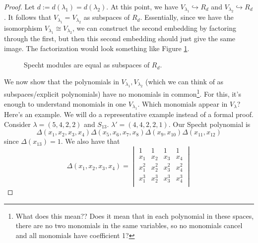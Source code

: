 \documentclass[../notes.tex]{subfiles}
\begin{document}
\begin{itemize}
\begin{proof}
        Let $d:=d(\lambda_1)=d(\lambda_2)$. At this point, we have $V_{\lambda_1}\hookrightarrow R_d$ and $V_{\lambda_2}\hookrightarrow R_d$. It follows that $V_{\lambda_1}=V_{\lambda_2}$ as subspaces of $R_d$. Essentially, since we have the isomorphism $V_{\lambda_1}\cong V_{\lambda_2}$, we can construct the second embedding by factoring through the first, but then this second embedding should just give the same image. The factorization would look something like Figure \ref{fig:SpechtSubspace}.
        \begin{figure}[H]
            \centering
            \caption{Specht modules are equal as subspaces of $R_d$.}
            \label{fig:SpechtSubspace}
        \end{figure}
        We now show that the polynomials in $V_{\lambda_1},V_{\lambda_2}$ (which we can think of as subspaces/explicit polynomials) have no monomials in common\footnote{What does this mean?? Does it mean that in each polynomial in these spaces, there are no two monomials in the same variables, so no monomials cancel and all monomials have coefficient 1?}. For this, it's enough to understand monomials in one $V_{\lambda_1}$. Which monomials appear in $V_\lambda$? Here's an example. We will do a representative example instead of a formal proof. Consider $\lambda=(5,4,2,2)$ and $S_{13}$. $\lambda'=(4,4,2,2,1)$. Our Specht polynomial is
        \begin{equation*}
            \Delta(x_1,x_2,x_3,x_4)\Delta(x_5,x_6,x_7,x_8)\Delta(x_9,x_{10})\Delta(x_{11},x_{12})
        \end{equation*}
        since $\Delta(x_{13})=1$. We also have that
        \begin{equation*}
            \Delta(x_1,x_2,x_3,x_4) =
            \begin{vmatrix}
                1 & 1 & 1 & 1\\
                x_1 & x_2 & x_3 & x_4\\
                x_1^2 & x_2^2 & x_3^2 & x_4^2\\
                x_1^3 & x_2^3 & x_3^3 & x_4^3\\

\end{vmatrix}
\end{equation*}
\end{proof}
\end{itemize}
\end{document}
